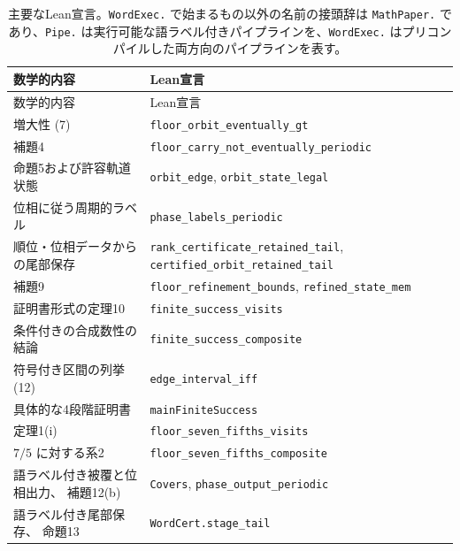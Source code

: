 \documentclass[11pt,reqno]{amsart}
\theoremstyle{definition}
\theoremstyle{definition}
\theoremstyle{remark}
\begin{document}

\begingroup
\small
\setlength{\tabcolsep}{4pt}
\renewcommand{\arraystretch}{1.15}
\setlength{\LTcapwidth}{\textwidth}
\begin{longtable}{@{}>{\raggedright\arraybackslash}p{} >{\raggedright\arraybackslash}p{}@{}}
\caption{主要なLean宣言。\texttt{WordExec.} で始まるもの以外の名前の接頭辞は
\texttt{MathPaper.} であり、\texttt{Pipe.} は実行可能な語ラベル付きパイプラインを、\texttt{WordExec.} はプリコンパイルした両方向のパイプラインを表す。}\label{tab:8}\\
\toprule
数学的内容 & Lean宣言 \\
\midrule
\endfirsthead
\toprule
数学的内容 & Lean宣言 \\
\midrule
\endhead
\bottomrule
\endlastfoot
増大性 (7) & \nolinkurl{floor_orbit_eventually_gt} \\
補題4 & \nolinkurl{floor_carry_not_eventually_periodic} \\
命題5および許容軌道状態 & \nolinkurl{orbit_edge},\allowbreak{} \nolinkurl{orbit_state_legal} \\
位相に従う周期的ラベル & \nolinkurl{phase_labels_periodic} \\
順位・位相データからの尾部保存 & \nolinkurl{rank_certificate_retained_tail},\allowbreak{} \nolinkurl{certified_orbit_retained_tail} \\
補題9 & \nolinkurl{floor_refinement_bounds},\allowbreak{} \nolinkurl{refined_state_mem} \\
証明書形式の定理10 & \nolinkurl{finite_success_visits} \\
条件付きの合成数性の結論 & \nolinkurl{finite_success_composite} \\
符号付き区間の列挙 (12) & \nolinkurl{edge_interval_iff} \\
具体的な4段階証明書 & \texttt{mainFiniteSuccess} \\
定理1(i) & \nolinkurl{floor_seven_fifths_visits} \\
\(7/5\) に対する系2 & \nolinkurl{floor_seven_fifths_composite} \\
語ラベル付き被覆と位相出力、\allowbreak{} 補題12(b) & \texttt{Covers},\allowbreak{} \nolinkurl{phase_output_periodic} \\
語ラベル付き尾部保存、\allowbreak{} 命題13 & \nolinkurl{WordCert.stage_tail} \\

\end{longtable}
\end{document}
